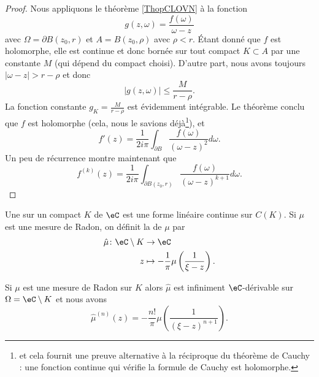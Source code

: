 \begin{proof}
    Nous appliquons le théorème \ref{ThopCLOVN} à la fonction
    \begin{equation}
        g(z,\omega)=\frac{ f(\omega) }{ \omega-z }
    \end{equation}
    avec \( \Omega=\partial B(z_0,r)\) et \( A=B(z_0,\rho)\) avec \( \rho<r\). Étant donné que \( f\) est holomorphe, elle est continue et donc bornée sur tout compact \( K\subset A\) par une constante \( M\) (qui dépend du compact choisi).  D'autre part, nous avons toujours \( | \omega-z |>r-\rho\) et donc
    \begin{equation}
        | g(z,\omega) |\leq \frac{ M }{ r-\rho }.
    \end{equation}
    La fonction constante \( g_K=\frac{ M }{ r-\rho }\) est évidemment intégrable. Le théorème conclu que \( f\) est holomorphe (cela, nous le savions déjà\footnote{et cela fournit une preuve alternative à la réciproque du théorème de Cauchy : une fonction continue qui vérifie la formule de Cauchy est holomorphe.}), et
    \begin{equation}
        f'(z)=\frac{1}{ 2i\pi }\int_{\partial B}\frac{ f(\omega) }{ (\omega-z)^2 }d\omega.
    \end{equation}
    Un peu de récurrence montre maintenant que
    \begin{equation}
        f^{(k)}(z)=\frac{1}{ 2i\pi }\int_{\partial B(z_0,r)}\frac{ f(\omega) }{ (\omega-z)^{k+1} }d\omega.
    \end{equation}
\end{proof}

\begin{definition}
    Une  sur un compact \(  K\) de \( \eC\) est une forme linéaire continue sur \( C(K)\). Si \( \mu\) est une mesure de Radon, on définit la  de \( \mu\) par 
    \begin{equation}
        \begin{aligned}
            \hat \mu\colon \eC\setminus K&\to \eC \\
            z&\mapsto -\frac{1}{ \pi }\mu\left( \frac{1}{ \xi-z } \right). 
        \end{aligned}
    \end{equation}
\end{definition}

\begin{theorem}     \label{ThoJVNTzn}
    Si \( \mu\) est une mesure de Radon sur \( K\) alors \( \hat \mu\) est infiniment \( \eC\)-dérivable sur \( \Omega=\eC\setminus K\) et nous avons
    \begin{equation}
        \hat\mu^{(n)}(z)=-\frac{ n! }{ \pi }\mu\left( \frac{1}{ (\xi-z)^{n+1} } \right).
    \end{equation}
\end{theorem}

